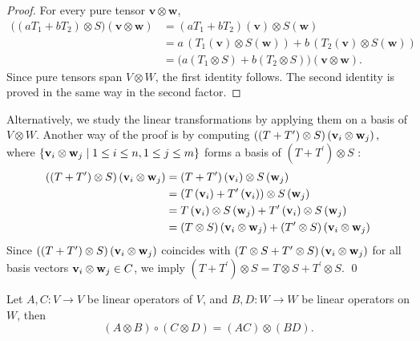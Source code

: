 \begin{proof}
For every pure tensor $\mathbf v\otimes\mathbf w$,
\begin{align*}
\bigl((aT_1+bT_2)\otimes S\bigr)(\mathbf v\otimes\mathbf w)
&=(aT_1+bT_2)(\mathbf v)\otimes S(\mathbf w)\\
&=a\,(T_1(\mathbf v)\otimes S(\mathbf w))+b\,(T_2(\mathbf v)\otimes S(\mathbf w))\\
&=\bigl(a(T_1\otimes S)+b(T_2\otimes S)\bigr)(\mathbf v\otimes\mathbf w).
\end{align*}
Since pure tensors span $V\otimes W$, the first identity follows. The second identity is proved in the same way in the second factor.
\end{proof} 

\noindent Alternatively, we study the linear transformations by applying them on a basis of $V \otimes W$. Another way of the proof is by computing
\(\left( {\left( {T + {T}^{\prime }}\right)  \otimes  S}\right) \left( {{\bf v}_{i} \otimes  {\bf w}_{j}}\right),
\)
where \(\left\{  {{\bf v}_{i} \otimes  {\bf w}_{j} \mid  1 \leq  i \leq  n,1 \leq  j \leq  m}\right\}\) forms a basis of \(\left( {T + {T}^{\prime }}\right)  \otimes  S\) :
\begin{align*}
\left( {\left( {T + {T}^{\prime }}\right)  \otimes  S}\right) \left( {{\bf v}_{i} \otimes  {\bf w}_{j}}\right)  &= \left( {T + {T}^{\prime }}\right) \left( {\bf v}_{i}\right)  \otimes  S\left( {\bf w}_{j}\right)
\\
&= \left( {T\left( {\bf v}_{i}\right)  + {T}^{\prime }\left( {\bf v}_{i}\right) }\right)  \otimes  S\left( {\bf w}_{j}\right)
\\
&= T\left( {\bf v}_{i}\right)  \otimes  S\left( {\bf w}_{j}\right)  + {T}^{\prime }\left( {\bf v}_{i}\right)  \otimes  S\left( {\bf w}_{j}\right)
\\
&= \left( {T \otimes  S}\right) \left( {{\bf v}_{i} \otimes  {\bf w}_{j}}\right)  + \left( {{T}^{\prime } \otimes  S}\right) \left( {{\bf v}_{i} \otimes  {\bf w}_{j}}\right)
\end{align*}
Since \(\left( {\left( {T + {T}^{\prime }}\right)  \otimes  S}\right) \left( {{\bf v}_{i} \otimes  {\bf w}_{j}}\right)\) coincides with \(\left( {T \otimes  S + {T}^{\prime } \otimes  S}\right) \left( {{\bf v}_{i} \otimes  {\bf w}_{j}}\right)\) for all basis vectors \({\bf v}_{i} \otimes  {\bf w}_{j} \in  C\), we imply
\(\left( {T + {T}^{\prime }}\right)  \otimes  S = T \otimes  S + {T}^{\prime } \otimes  S 
\).
\qed

\begin{proposition}
Let \(A,C: V \to V\) be linear operators of \(V\), and \(B,D: W \to W\) be linear operators on \(W\), then
\[
\left( {A \otimes  B}\right)  \circ  \left( {C \otimes  D}\right)  = \left( {AC}\right)  \otimes  \left( {BD}\right).
\] 
\end{proposition}

